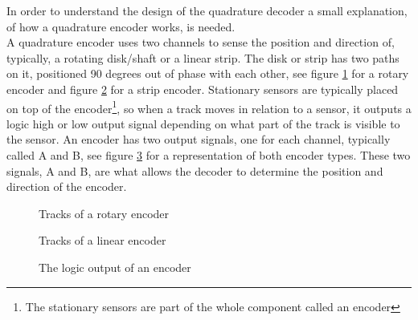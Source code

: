 \documentclass[../../../main]{subfiles}
\begin{document}
\label{subsec:Theory_encoder}
In order to understand the design of the quadrature decoder a small explanation, of how a quadrature encoder works, is needed. \\
A quadrature encoder uses two channels to sense the position and direction of, typically, a rotating disk/shaft or a linear strip. The disk or strip has two paths on it, positioned 90 degrees out of phase with each other, see figure \ref{rotary_encoder} for a rotary encoder and figure \ref{channels} for a strip encoder. Stationary sensors are typically placed on top of the encoder\footnote{The stationary sensors are part of the whole component called an encoder}, so when a track moves in relation to a sensor, it outputs a logic high or low output signal depending on what part of the track is visible to the sensor. An encoder has two output signals, one for each channel, typically called A and B, see figure \ref{output_channels} for a representation of both encoder types. These two signals, A and B, are what allows the decoder to determine the position and direction of the encoder. \cite{encoder_princpel}

\begin{figure}[H]
  \centering
  \def\svgwidth{0.4\columnwidth}
  \fontsize{9}{9}\selectfont
  
  \caption{Tracks of a rotary encoder}
  \label{rotary_encoder}
\end{figure}

\begin{figure}[H]
  \centering
  \def\svgwidth{0.7\columnwidth}
  \fontsize{9}{9}\selectfont
  
  \caption{Tracks of a linear encoder}
  \label{channels}
\end{figure}

\begin{figure}[H]
  \centering
  \def\svgwidth{0.7\columnwidth}
  \fontsize{9}{9}\selectfont
  
  \caption{The logic output of an encoder}
  \label{output_channels}
\end{figure}
\end{document}
